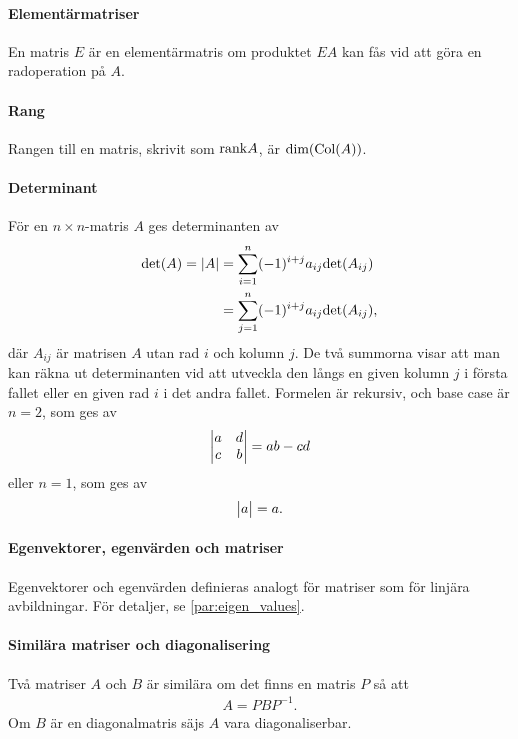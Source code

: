 \paragraph{Elementärmatriser}
En matris $E$ är en elementärmatris om produktet $EA$ kan fås vid att göra en radoperation på $A$.

\paragraph{Rang}
Rangen till en matris, skrivit som $\text{rank} A$, är $\text{dim}(\text{Col}(A))$.

\paragraph{Determinant}
För en $n\times n$-matris $A$ ges determinanten av
\begin{align*}
	\text{det}(A) = \abs{A} &= \sum\limits_{i = 1}^{n}(-1)^{i + j}a_{ij}\text{det}(A_{ij}) \\
	&= \sum\limits_{j = 1}^{n}(-1)^{i + j}a_{ij}\text{det}(A_{ij}),
\end{align*}
där $A_{ij}$ är matrisen $A$ utan rad $i$ och kolumn $j$. De två summorna visar att man kan räkna ut determinanten vid att utveckla den långs en given kolumn $j$ i första fallet eller en given rad $i$ i det andra fallet. Formelen är rekursiv, och base case är $n=2$, som ges av
\begin{align*}
	\mdet{a & d \\ c & b} = ab - cd
\end{align*}
eller $n = 1$, som ges av
\begin{align*}
	\mdet{a} = a.
\end{align*}

\paragraph{Egenvektorer, egenvärden och matriser}
Egenvektorer och egenvärden definieras analogt för matriser som för linjära avbildningar. För detaljer, se \ref{par:eigen_values}.

\paragraph{Similära matriser och diagonalisering}
Två matriser $A$ och $B$ är similära om det finns en matris $P$ så att
\begin{align*}
	A = PBP^{-1}.
\end{align*}
Om $B$ är en diagonalmatris säjs $A$ vara diagonaliserbar.

